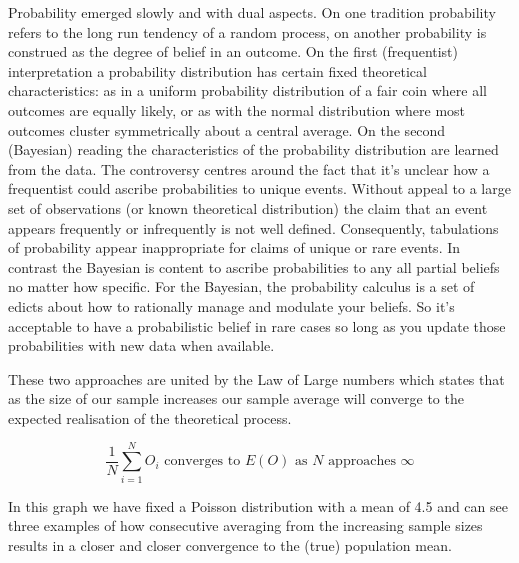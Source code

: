 \documentclass[
]{book}
\theoremstyle{definition}
\theoremstyle{definition}
\theoremstyle{definition}
\theoremstyle{remark}
\begin{document}
Probability emerged slowly and with dual aspects. On one tradition probability refers to the long run tendency of a random process, on another probability is construed as the degree of belief in an outcome. On the first (frequentist) interpretation a probability distribution has certain fixed theoretical characteristics: as in a uniform probability distribution of a fair coin where all outcomes are equally likely, or as with the normal distribution where most outcomes cluster symmetrically about a central average. On the second (Bayesian) reading the characteristics of the probability distribution are learned from the data. The controversy centres around the fact that it's unclear how a frequentist could ascribe probabilities to unique events. Without appeal to a large set of observations (or known theoretical distribution) the claim that an event appears frequently or infrequently is not well defined. Consequently, tabulations of probability appear inappropriate for claims of unique or rare events. In contrast the Bayesian is content to ascribe probabilities to any all partial beliefs no matter how specific. For the Bayesian, the probability calculus is a set of edicts about how to rationally manage and modulate your beliefs. So it's acceptable to have a probabilistic belief in rare cases so long as you update those probabilities with new data when available.

These two approaches are united by the Law of Large numbers which states that as the size of our sample increases our sample average will converge to the expected realisation of the theoretical process.

\[  \frac{1}{N} \sum_{i = 1}^{N} O_{i} \text{ converges to }  E(O) \text{ as } N \text{ approaches } \infty \]

In this graph we have fixed a Poisson distribution with a mean of 4.5 and can see three examples of how consecutive averaging from the increasing sample sizes results in a closer and closer convergence to the (true) population mean.
\end{document}
